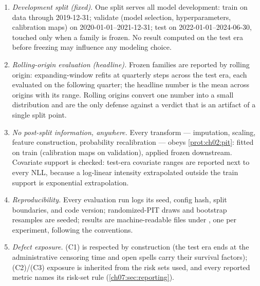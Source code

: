 \begin{protocol}\label{prot:ch07:temporal}
\leavevmode
\begin{enumerate}[label=(\alph*)]
\item \emph{Development split (fixed).} One split serves all model
development: train on data through 2019-12-31; validate (model selection,
hyperparameters, calibration maps) on 2020-01-01--2021-12-31; test on
2022-01-01--2024-06-30, touched only when a family is frozen. No result
computed on the test era before freezing may influence any modeling
choice.
\item \emph{Rolling-origin evaluation (headline).} Frozen families are
reported by rolling origin: expanding-window refits at quarterly steps
across the test era, each evaluated on the following quarter; the
headline number is the mean across origins with its range. Rolling
origins convert one number into a small distribution and are the only
defense against a verdict that is an artifact of a single split point.
\item \emph{No post-split information, anywhere.} Every transform ---
imputation, scaling, feature construction, probability recalibration ---
obeys \cref{prot:ch02:pit}: fitted on train (calibration maps on
validation), applied frozen downstream. Covariate support is checked:
test-era covariate ranges are reported next to every NLL, because a
log-linear intensity extrapolated outside the train support is
exponential extrapolation.
\item \emph{Reproducibility.} Every evaluation run logs its seed, config
hash, split boundaries, and code version; randomized-PIT draws and
bootstrap resamples are seeded; results are machine-readable files under
, one per experiment, following the 
conventions.
\item \emph{Defect exposure.} (C1) is respected by construction (the
test era ends at the administrative censoring time and open spells carry
their survival factors); (C2)/(C3) exposure is inherited from the risk
sets used, and every reported metric names its risk-set rule
(\cref{ch07:sec:reporting}).
\end{enumerate}
\end{protocol}

